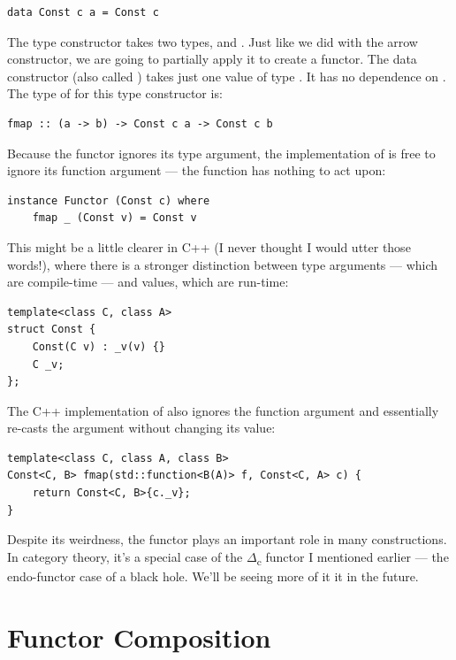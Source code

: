 \begin{Verbatim}[commandchars=\\\{\}]
data Const c a = Const c
\end{Verbatim}
The  type constructor takes two types,  and
. Just like we did with the arrow constructor, we are going to
partially apply it to create a functor. The data constructor (also
called ) takes just one value of type . It has
no dependence on . The type of  for this type
constructor is:

\begin{Verbatim}[commandchars=\\\{\}]
fmap :: (a -> b) -> Const c a -> Const c b
\end{Verbatim}
Because the functor ignores its type argument, the implementation of
 is free to ignore its function argument --- the function
has nothing to act upon:

\begin{Verbatim}[commandchars=\\\{\}]
instance Functor (Const c) where
    fmap _ (Const v) = Const v
\end{Verbatim}
This might be a little clearer in C++ (I never thought I would utter
those words!), where there is a stronger distinction between type
arguments --- which are compile-time --- and values, which are run-time:

\begin{Verbatim}[commandchars=\\\{\}]
template<class C, class A>
struct Const { 
    Const(C v) : _v(v) {}
    C _v;
};
\end{Verbatim}
The C++ implementation of  also ignores the function
argument and essentially re-casts the  argument without
changing its value:

\begin{Verbatim}[commandchars=\\\{\}]
template<class C, class A, class B>
Const<C, B> fmap(std::function<B(A)> f, Const<C, A> c) {
    return Const<C, B>{c._v};
}
\end{Verbatim}
Despite its weirdness, the  functor plays an important
role in many constructions. In category theory, it's a special case of
the \ensuremath{\Delta}\textsubscript{c} functor I mentioned earlier --- the endo-functor
case of a black hole. We'll be seeing more of it it in the future.

\section{Functor Composition}\label{functor-composition}

